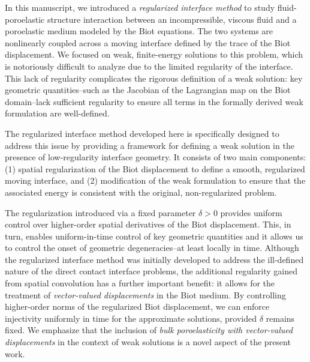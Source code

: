 \documentclass[11pt]{article}
\theoremstyle{definition}
\begin{document}
In this manuscript, we introduced a {\emph{regularized interface method}} to study fluid-poroelastic structure interaction between an incompressible, viscous fluid and a poroelastic medium modeled by the Biot equations. The two systems are nonlinearly coupled across a moving interface defined by the trace of the Biot displacement. We focused on weak, finite-energy solutions to this problem, which is notoriously difficult to analyze due to the limited regularity of the interface. This lack of regularity complicates the rigorous definition of a weak solution: key geometric quantities--such as the Jacobian of the Lagrangian map on the Biot domain--lack sufficient regularity to ensure all terms in the formally derived weak formulation are well-defined.

The regularized interface method developed here is specifically designed to address this issue by providing a framework for defining a weak solution in the presence of low-regularity interface geometry. It consists of two main components: (1) spatial regularization of the Biot displacement to define a smooth, regularized moving interface, and (2) modification of the weak formulation to ensure that the associated energy is consistent with the original, non-regularized problem.

The regularization introduced via a fixed parameter $\delta > 0$ provides uniform control over higher-order spatial derivatives of the Biot displacement. This, in turn, enables uniform-in-time control of key geometric quantities and it allows us to control the onset of geometric degeneracies--at least locally in time. 
%
Although the regularized interface method was initially developed to address the ill-defined nature of the direct contact interface problems, the additional regularity gained from spatial convolution has a further important benefit: it allows for the treatment of \emph{vector-valued displacements} in the Biot medium. By controlling higher-order norms of the regularized Biot displacement, we can enforce injectivity uniformly in time for the approximate solutions, provided $\delta$ remains fixed. We emphasize that the inclusion of \textit{bulk poroelasticity with vector-valued displacements} in the context of weak solutions is a novel aspect of the present work. 
\end{document}
